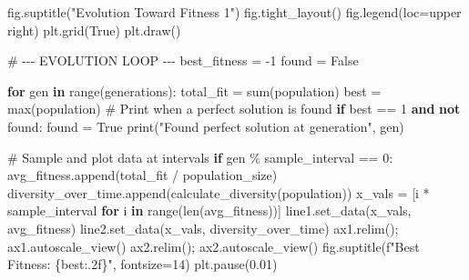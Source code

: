 \documentclass[
  letterpaper,
  DIV=11,
  numbers=noendperiod]{scrreprt}
\newenvironment{Shaded}{\begin{snugshade}}{\end{snugshade}}
\newcommand{\BuiltInTok}[1]{\textcolor[rgb]{0.00,0.23,0.31}{#1}}
\newcommand{\CommentTok}[1]{\textcolor[rgb]{0.37,0.37,0.37}{#1}}
\newcommand{\ControlFlowTok}[1]{\textcolor[rgb]{0.00,0.23,0.31}{\textbf{#1}}}
\newcommand{\DecValTok}[1]{\textcolor[rgb]{0.68,0.00,0.00}{#1}}
\newcommand{\FloatTok}[1]{\textcolor[rgb]{0.68,0.00,0.00}{#1}}
\newcommand{\KeywordTok}[1]{\textcolor[rgb]{0.00,0.23,0.31}{\textbf{#1}}}
\newcommand{\NormalTok}[1]{\textcolor[rgb]{0.00,0.23,0.31}{#1}}
\newcommand{\OperatorTok}[1]{\textcolor[rgb]{0.37,0.37,0.37}{#1}}
\newcommand{\SpecialCharTok}[1]{\textcolor[rgb]{0.37,0.37,0.37}{#1}}
\newcommand{\SpecialStringTok}[1]{\textcolor[rgb]{0.13,0.47,0.30}{#1}}
\newcommand{\StringTok}[1]{\textcolor[rgb]{0.13,0.47,0.30}{#1}}
\newcommand{\VariableTok}[1]{\textcolor[rgb]{0.07,0.07,0.07}{#1}}
\theoremstyle{definition}
\theoremstyle{remark}
\begin{document}
\begin{tcolorbox}
\begin{Shaded}
\begin{Highlighting}[]
\NormalTok{fig.suptitle(}\StringTok{"Evolution Toward Fitness 1"}\NormalTok{)}
\NormalTok{fig.tight\_layout()}
\NormalTok{fig.legend(loc}\OperatorTok{=}\StringTok{\textquotesingle{}upper right\textquotesingle{}}\NormalTok{)}
\NormalTok{plt.grid(}\VariableTok{True}\NormalTok{)}
\NormalTok{plt.draw()}

\CommentTok{\# {-}{-}{-} EVOLUTION LOOP {-}{-}{-}}
\NormalTok{best\_fitness }\OperatorTok{=} \OperatorTok{{-}}\DecValTok{1}
\NormalTok{found }\OperatorTok{=} \VariableTok{False}

\ControlFlowTok{for}\NormalTok{ gen }\KeywordTok{in} \BuiltInTok{range}\NormalTok{(generations):}
\NormalTok{    total\_fit }\OperatorTok{=} \BuiltInTok{sum}\NormalTok{(population)}
\NormalTok{    best }\OperatorTok{=} \BuiltInTok{max}\NormalTok{(population)}
    \CommentTok{\# Print when a perfect solution is found}
    \ControlFlowTok{if}\NormalTok{ best }\OperatorTok{==} \DecValTok{1} \KeywordTok{and} \KeywordTok{not}\NormalTok{ found:}
\NormalTok{        found }\OperatorTok{=} \VariableTok{True}
        \BuiltInTok{print}\NormalTok{(}\StringTok{"Found perfect solution at generation"}\NormalTok{, gen)}
        
    \CommentTok{\# Sample and plot data at intervals}
    \ControlFlowTok{if}\NormalTok{ gen }\OperatorTok{\%}\NormalTok{ sample\_interval }\OperatorTok{==} \DecValTok{0}\NormalTok{:}
\NormalTok{        avg\_fitness.append(total\_fit }\OperatorTok{/}\NormalTok{ population\_size)}
\NormalTok{        diversity\_over\_time.append(calculate\_diversity(population))}
\NormalTok{        x\_vals }\OperatorTok{=}\NormalTok{ [i }\OperatorTok{*}\NormalTok{ sample\_interval }\ControlFlowTok{for}\NormalTok{ i }\KeywordTok{in} \BuiltInTok{range}\NormalTok{(}\BuiltInTok{len}\NormalTok{(avg\_fitness))]}
\NormalTok{        line1.set\_data(x\_vals, avg\_fitness)}
\NormalTok{        line2.set\_data(x\_vals, diversity\_over\_time)}
\NormalTok{        ax1.relim()}\OperatorTok{;}\NormalTok{ ax1.autoscale\_view()}
\NormalTok{        ax2.relim()}\OperatorTok{;}\NormalTok{ ax2.autoscale\_view()}
\NormalTok{        fig.suptitle(}\SpecialStringTok{f"Best Fitness: }\SpecialCharTok{\{}\NormalTok{best}\SpecialCharTok{:.2f\}}\SpecialStringTok{"}\NormalTok{, fontsize}\OperatorTok{=}\DecValTok{14}\NormalTok{)}
\NormalTok{        plt.pause(}\FloatTok{0.01}\NormalTok{)}
        


\end{Highlighting}
\end{Shaded}
\end{tcolorbox}
\end{document}
